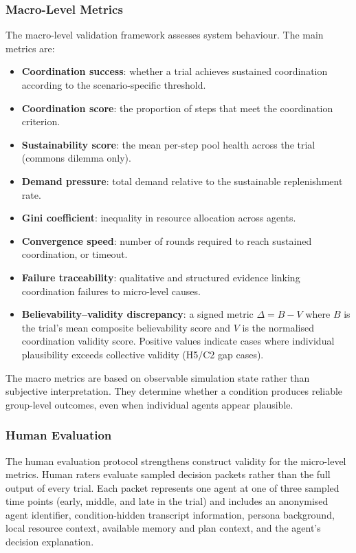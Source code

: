 \documentclass[11pt]{article}
\begin{document}
\subsubsection{Macro-Level Metrics}
The macro-level validation framework assesses system behaviour. The main metrics are:

\begin{itemize}
    \item \textbf{Coordination success}: whether a trial achieves sustained coordination according to the scenario-specific threshold.
    \item \textbf{Coordination score}: the proportion of steps that meet the coordination criterion.
    \item \textbf{Sustainability score}: the mean per-step pool health across the trial (commons dilemma only).
    \item \textbf{Demand pressure}: total demand relative to the sustainable replenishment rate.
    \item \textbf{Gini coefficient}: inequality in resource allocation across agents.
    \item \textbf{Convergence speed}: number of rounds required to reach sustained coordination, or timeout.
    \item \textbf{Failure traceability}: qualitative and structured evidence linking coordination failures to micro-level causes.
    \item \textbf{Believability--validity discrepancy}: a signed metric $\Delta = B - V$ where $B$ is the trial's mean composite believability score and $V$ is the normalised coordination validity score. Positive values indicate cases where individual plausibility exceeds collective validity (H5/C2 gap cases).
\end{itemize}

The macro metrics are based on observable simulation state rather than subjective interpretation. They determine whether a condition produces reliable group-level outcomes, even when individual agents appear plausible.

\subsubsection{Human Evaluation}
The human evaluation protocol strengthens construct validity for the micro-level metrics. Human raters evaluate sampled decision packets rather than the full output of every trial. Each packet represents one agent at one of three sampled time points (early, middle, and late in the trial) and includes an anonymised agent identifier, condition-hidden transcript information, persona background, local resource context, available memory and plan context, and the agent's decision explanation.
\end{document}
